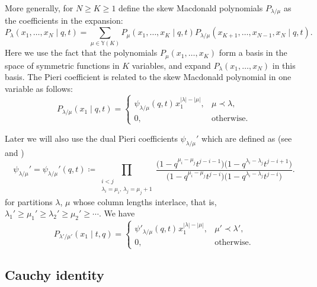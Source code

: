 \documentclass[11pt]{article}
\numberwithin{equation}{section}
\numberwithin{equation}{section}
\begin{document}
More generally, for $N\ge K\ge1$
define the skew Macdonald polynomials
$P_{\lambda/\mu}$
as the coefficients
in the expansion:
\begin{equation*}
	P_\lambda(x_1,\dots,x_N \mid q,t)=
	\sum_{\mu\in \mathbb{Y}(K)}
	P_\mu(x_1,\dots,x_K \mid q,t )
	P_{\lambda/\mu}(x_{K+1},\dots,x_{N-1},x_N \mid q,t ).
\end{equation*}
Here we use the fact that
the polynomials
$P_\mu(x_1,\dots,x_K )$
form a basis in the space of symmetric functions in $K$ variables, and
expand
$P_\lambda(x_1,\dots,x_N )$
in this basis.
The Pieri coefficient is related to the skew Macdonald polynomial
in one variable as follows:
\begin{equation*}%
	P_{\lambda/\mu}(x_1\mid q,t)=
	\begin{cases}
		\psi_{\lambda/\mu}(q,t)\hspace{1pt} x_1^{|\lambda|-|\mu|},&\mu\prec \lambda,\\
		0,&\text{otherwise}.
	\end{cases}
\end{equation*}

Later we will also use the dual Pieri coefficients
$\psi_{\lambda/\mu}'$ which are defined as
(see \cite[formula~(VI.6.24.iv)]{Macdonald1995} and
\cite[formula~(2.12)]{BorodinCorwin2011Macdonald})
\begin{equation}
	\label{eq:psi_prime_Pieri}
	\psi_{\lambda/\mu}'=
	\psi_{\lambda/\mu}'(q,t)
	\coloneqq
	\prod_{\substack{i<j \\ \lambda_{i}=\mu_{i},\, \lambda_{j}=\mu_{j}+1}}
	\frac{\big(1-q^{\mu_{i}-\mu_{j}} t^{j-i-1}\big)\big(1-q^{\lambda_{i}-\lambda_{j}} t^{j-i+1}\big)}
	{\big(1-q^{\mu_{i}-\mu_{j}} t^{j-i}\big)\big(1-q^{\lambda_{i}-\lambda_{j}} t^{j-i}\big)}.
\end{equation}
for partitions $\lambda$, $\mu$ whose column lengths interlace,
that is,
$\lambda_1'\ge \mu_1'\ge \lambda_2'\ge \mu_2'\ge \cdots $.
We have
\begin{equation}
	\label{eq:P_skew_single_variable_dual}
	P_{\lambda'/\mu'}(x_1 \mid t,q)=
	\begin{cases}
		\psi'_{\lambda/\mu}(q,t)\hspace{1pt} x_1^{|\lambda|-|\mu|}
		,&\mu'\prec \lambda',\\
		0
		,&\text{otherwise}.
	\end{cases}
\end{equation}

\subsection{Cauchy identity}\label{sub:Cauchy_and_Dyson1}
\end{document}
